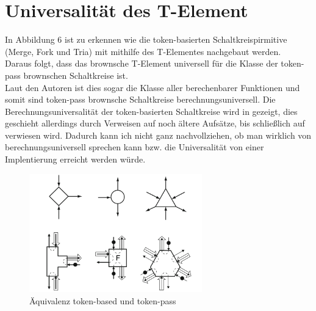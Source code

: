 \documentclass[11pt,a4paper]{article}
\begin{document}
\section{Universalität des T-Element}

In Abbildung 6 ist zu erkennen wie die token-basierten Schaltkreispirmitive 
(Merge, Fork und Tria) mit mithilfe des T-Elementes nachgebaut werden.
%
\\
Daraus folgt, dass das brownsche T-Element universell für die Klasse der 
token-pass brownschen Schaltkreise ist.
\\
%
Laut den Autoren ist dies sogar die Klasse aller berechenbarer Funktionen und
somit sind token-pass brownsche Schaltkreise berechnungsuniversell. 
%
Die Berechnungsuniversalität der token-basierten Schaltkreise wird in
\cite{Lee_2005} gezeigt, dies geschieht allerdings durch Verweisen auf 
noch ältere Aufsätze, bis schließlich  auf \cite{Keller_1974} verwiesen wird.
%
Dadurch kann ich nicht ganz nachvollziehen, ob man wirklich von
berechnungsuniversell sprechen kann bzw. die Universalität 
von einer Implentierung erreicht werden würde. 

\begin{figure}[h]
    \centering
    \includegraphics[width=7.5cm]{bilder/BasedToPass.png}
    \caption{Äquivalenz token-based und token-pass}
    \label{fig:BasedToPass}
\end{figure}


\end{document}
